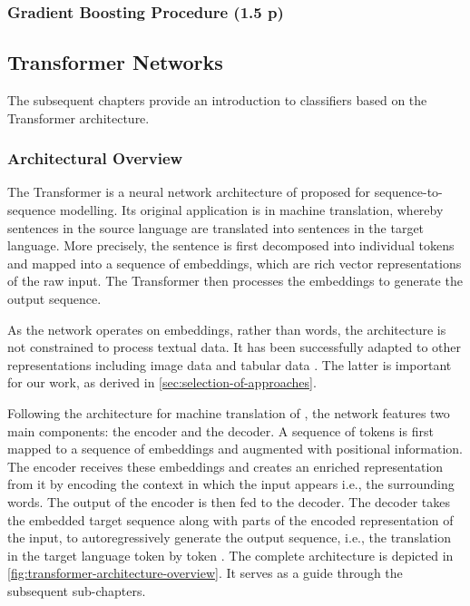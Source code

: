 \subsubsection{Gradient Boosting
Procedure (1.5 p)}\label{sec:gradient-boosting-procedure}

\subsection{Transformer Networks}\label{sec:transformer-networks}

The subsequent chapters provide an introduction to classifiers based on the Transformer architecture.

\subsubsection{Architectural Overview}\label{sec:architectural-overview}

The Transformer is a neural network architecture of \textcite[][6002--6006]{vaswaniAttentionAllYou2017} proposed for sequence-to-sequence modelling. Its original application is in machine translation, whereby sentences in the source language are translated into sentences in the target language. More precisely, the sentence is first decomposed into individual \glspl{token} and mapped into a sequence of \glspl{embedding}, which are rich vector representations of the raw input. The Transformer then processes the \glspl{embedding} to generate the output sequence.

As the network operates on \glspl{embedding}, rather than words, the architecture is not constrained to process textual data. It has been successfully adapted to other representations including image data \autocites[][2--5]{parmarImageTransformer2018}[][3]{dosovitskiyImageWorth16x162021} and tabular data \autocite[cp.][18932]{gorishniyRevisitingDeepLearning2021}. The latter is important for our work, as derived in \cref{sec:selection-of-approaches}.

Following the architecture for machine translation of \textcite[][3]{sutskeverSequenceSequenceLearning2014}, the network features two main components: the encoder and the decoder. A sequence of \glspl{token} is first mapped to a sequence of \glspl{embedding} and augmented with positional information. The encoder receives these \glspl{embedding} and creates an enriched representation from it by encoding the context in which the input appears i.e., the surrounding words. The output of the encoder is then fed to the decoder. The decoder takes the embedded target sequence along with parts of the encoded representation of the input, to autoregressively generate the output sequence, i.e., the translation in the target language \gls{token} by \gls{token} \autocite[][3]{vaswaniAttentionAllYou2017}. The complete architecture is depicted in \cref{fig:transformer-architecture-overview}. It serves as a guide through the subsequent sub-chapters.

